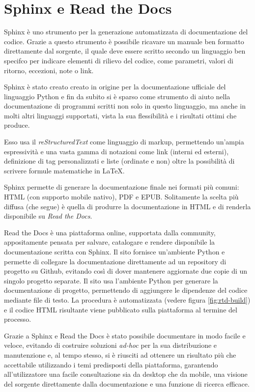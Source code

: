 
\section{Sphinx e Read the Docs}
\label{seq:sphinx-rtd}
Sphinx è uno strumento per la generazione automatizzata di documentazione
del codice. Grazie a questo strumento è possibile ricavare un manuale
ben formatto direttamente dal sorgente, il quale deve essere scritto
secondo un linguaggio ben specifco per indicare elementi di rilievo
del codice, come parametri, valori di ritorno, eccezioni,
note o link.

Sphinx è stato creato creato in origine per la documentazione ufficiale
del linguaggio Python\cite{python-doc} e fin da subito si è sparso
come strumento di aiuto nella documentazione di programmi scritti
non solo in questo linguaggio, ma anche in molti altri linguaggi supportati,
vista la sua flessibilità e i risultati ottimi che produce.

Esso usa il \emph{reStructuredText} come linguaggio di markup, permettendo
un'ampia espressività e una vasta gamma di notazioni come link (interni ed esterni),
definizione di tag personalizzati e liste (ordinate e non) oltre la possibilità
di scrivere formule matematiche in \LaTeX.

Sphinx permette di generare la documentazione finale nei formati più comuni:
HTML (con supporto mobile nativo), PDF e EPUB. Solitamente la scelta
più diffusa (che \pygfa segue) è quella di produrre la documentazione in
HTML e di renderla disponibile su \emph{Read the Docs}.

\label{seq:sphinx}
Read the Docs è una piattaforma online, supportata dalla community,
appositamente pensata per salvare, catalogare e rendere disponibile
la documentazione scritta con Sphinx.
Il sito fornisce un'ambiente Python e permette di collegare la documentazione
direttamente ad un repository di progetto su Github, evitando così di
dover mantenere aggiornate due copie di un singolo progetto separate.
Il sito usa l'ambiente Python per generare la documentazione di
progetto, permettendo di aggiungere le dipendenze del codice mediante
file di testo. La procedura è automatizzata (vedere figura
\ref{fig:rtd-build}) e il codice HTML risultante viene pubblicato sulla
piattaforma al termine del processo.

Grazie a Sphinx e Read the Docs è stato possibile documentare \pygfa
in modo facile e veloce, evitando di costruire soluzioni \emph{ad-hoc}
per la sua distribuzione e manutenzione e, al tempo stesso,
si è riusciti ad ottenere un risultato più che accettabile utilizzando
i temi predisposti della piattaforma, garantendo all'utilizzatore
una facile consultazione sia da desktop che da mobile, una visione
del sorgente direttamente dalla documentazione e una funzione
di ricerca efficace.

